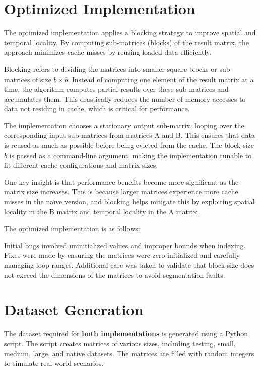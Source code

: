 \documentclass[12pt]{article}
\begin{document}
\section{Optimized Implementation}
The optimized implementation applies a blocking strategy to improve spatial and temporal locality. By computing sub-matrices (blocks) of the result matrix, the approach minimizes cache misses by reusing loaded data efficiently.

Blocking refers to dividing the matrices into smaller square blocks or sub-matrices of size \( b \times b \). Instead of computing one element of the result matrix at a time, the algorithm computes partial results over these sub-matrices and accumulates them. This drastically reduces the number of memory accesses to data not residing in cache, which is critical for performance.

The implementation chooses a stationary output sub-matrix, looping over the corresponding input sub-matrices from matrices A and B. This ensures that data is reused as much as possible before being evicted from the cache. The block size \( b \) is passed as a command-line argument, making the implementation tunable to fit different cache configurations and matrix sizes.

One key insight is that performance benefits become more significant as the matrix size increases. This is because larger matrices experience more cache misses in the naïve version, and blocking helps mitigate this by exploiting spatial locality in the B matrix and temporal locality in the A matrix.


The optimized implementation is as follows:



Initial bugs involved uninitialized values and improper bounds when indexing. Fixes were made by ensuring the matrices were zero-initialized and carefully managing loop ranges. Additional care was taken to validate that block size does not exceed the dimensions of the matrices to avoid segmentation faults.

\section{Dataset Generation}
The dataset required for \textbf{both implementations} is generated using a Python script. The script creates matrices of various sizes, including testing, small, medium, large, and native datasets. The matrices are filled with random integers to simulate real-world scenarios.
\end{document}
